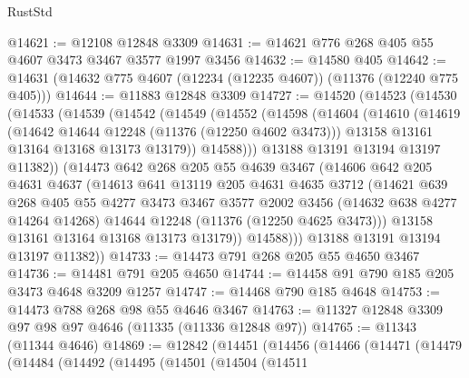 \begin{lexlean}{RustStd}
\begin{coremodule}
{{{{{{{{{{{{{{{{{{{@14621 := @12108 @12848 @3309
@14631 := @14621 @776 @268 @405 @55 @4607 @3473 @3467 @3577 @1997 @3456
@14632 := @14580 @405
@14642 := @14631 (@14632 @775 @4607 (@12234 (@12235 @4607)) (@11376 (@12240 @775 @405)))
@14644 := @11883 @12848 @3309
@14727 := @14520
    (@14523
      (@14530
        (@14533
          (@14539
            (@14542
              (@14549
                (@14552
                  (@14598
                    (@14604
                      (@14610
                        (@14619
                          (@14642 @14644 @12248 (@11376 (@12250 @4602 @3473)))
                          @13158
                          @13161
                          @13164
                          @13168
                          @13173
                          @13179))
                      @14588)))
                @13188
                @13191
                @13194
                @13197
                @11382))
            (@14473
              @642
              @268
              @205
              @55
              @4639
              @3467
              (@14606
                @642
                @205
                @4631
                @4637
                (@14613
                  @641
                  @13119
                  @205
                  @4631
                  @4635
                  @3712
                  (@14621
                    @639
                    @268
                    @405
                    @55
                    @4277
                    @3473
                    @3467
                    @3577
                    @2002
                    @3456
                    (@14632 @638 @4277 @14264 @14268)
                    @14644
                    @12248
                    (@11376 (@12250 @4625 @3473)))
                  @13158
                  @13161
                  @13164
                  @13168
                  @13173
                  @13179))
              @14588)))
        @13188
        @13191
        @13194
        @13197
        @11382))
@14733 := @14473 @791 @268 @205 @55 @4650 @3467
@14736 := @14481 @791 @205 @4650
@14744 := @14458 @91 @790 @185 @205 @3473 @4648 @3209 @1257
@14747 := @14468 @790 @185 @4648
@14753 := @14473 @788 @268 @98 @55 @4646 @3467
@14763 := @11327 @12848 @3309 @97 @98 @97 @4646 (@11335 (@11336 @12848 @97))
@14765 := @11343 (@11344 @4646)
@14869 := @12842
    (@14451
      (@14456
        (@14466
          (@14471
            (@14479
              (@14484
                (@14492
                  (@14495
                    (@14501
                      (@14504
                        (@14511
}}}}}}}}}}}}}}}}}}}
\end{coremodule}
\end{lexlean}
